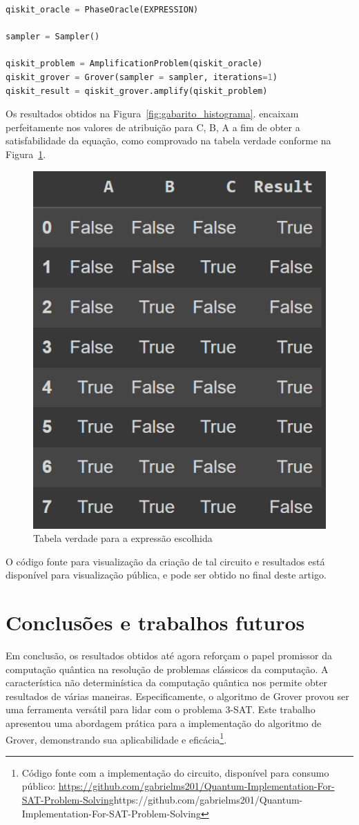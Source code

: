 \documentclass[12pt]{article}
\begin{document}
\begin{lstlisting}[language=Python, caption={Criação do circuito utilizando as abstrações da biblioteca Qiskit}, label={lst:oraculo}, frame=single]
qiskit_oracle = PhaseOracle(EXPRESSION)

sampler = Sampler()

qiskit_problem = AmplificationProblem(qiskit_oracle)
qiskit_grover = Grover(sampler = sampler, iterations=1)
qiskit_result = qiskit_grover.amplify(qiskit_problem)
\end{lstlisting}
Os resultados obtidos na Figura~\ref{fig:gabarito_histograma}. encaixam perfeitamente nos valores de atribuição para C, B, A a fim de obter a satisfabilidade da equação, como comprovado na tabela verdade conforme na Figura~\ref{fig:tabela_verdade}.
\begin{figure}[ht]
\centering
\includegraphics[width=.4\textwidth]{tabela_verdade.png}
\caption{Tabela verdade para a expressão escolhida}
\label{fig:tabela_verdade}
\end{figure}
O código fonte para visualização da criação de tal circuito e resultados está disponível para visualização pública, e pode ser obtido no final deste artigo.

\section{Conclusões e trabalhos futuros}

Em conclusão, os resultados obtidos até agora reforçam o papel promissor da computação quântica na resolução de problemas clássicos da computação. A característica não determinística da computação quântica nos permite obter resultados de várias maneiras. Especificamente, o algoritmo de Grover provou ser uma ferramenta versátil para lidar com o problema 3-SAT. Este trabalho apresentou uma abordagem prática para a implementação do algoritmo de Grover, demonstrando sua aplicabilidade e eficácia\footnote{Código fonte com a implementação do circuito, disponível para consumo público:
\url{https://github.com/gabrielms201/Quantum-Implementation-For-SAT-Problem-Solving}{https://github.com/gabrielms201/Quantum-Implementation-For-SAT-Problem-Solving}}.



\end{document}
